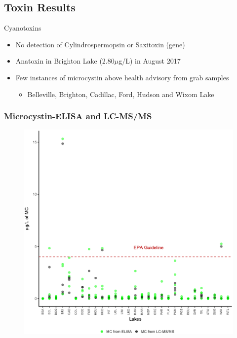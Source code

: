 \subsection{Toxin Results}
\begin{frame}{Cyanotoxins}
	\begin{itemize}
		\item No detection of Cylindrospermopsin or Saxitoxin (gene)
		\item Anatoxin in Brighton Lake (2.80$\mu$g/L) in August 2017
		\item Few instances of microcystin above health advisory from grab samples
			\begin{itemize}
				\item Belleville, Brighton, Cadillac, Ford, Hudson and Wixom Lake
				
			\end{itemize}

			
	\end{itemize}
\end{frame}
\begin{frame}
	\frametitle{Microcystin-ELISA and LC-MS/MS}


	\begin{figure}
		\includegraphics[width=\textwidth,height=0.9\textheight]{../figures/Microcystin.eps}
	\end{figure}

\end{frame}
